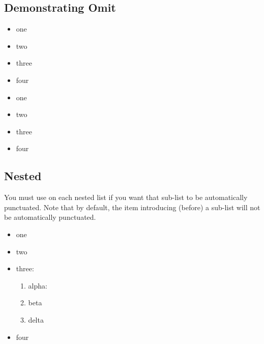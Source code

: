 \documentclass[11pt,parskip=half]{scrartcl}
\newcommand{\cmd}[1]{\texttt{\detokenize{#1}}}
\begin{document}
\subsection{Demonstrating Omit}

\begin{LTXexample}
\begin{itemize}[autopunc]
    \item one
    \item two
    \item three \APomit
    \item four
\end{itemize}
\end{LTXexample}

\begin{LTXexample}
\begin{itemize}[autopunc]
    \item one
    \item two
    \item three \APomit
    \item four  \APomit
\end{itemize}
\end{LTXexample}

\subsection{Nested}
You must use \cmd{autopunc} on each nested list if you want that sub-list to be automatically punctuated.
Note that by default, the item introducing (before) a sub-list will not be automatically punctuated.

\begin{LTXexample}
\begin{itemize}[autopunc]
    \item one
    \item two
    \item three:
    \begin{enumerate}[autopunc]
        \item alpha:
        \item beta
        \item delta
    \end{enumerate}
    \item four
\end{itemize}
\end{LTXexample}
\end{document}
